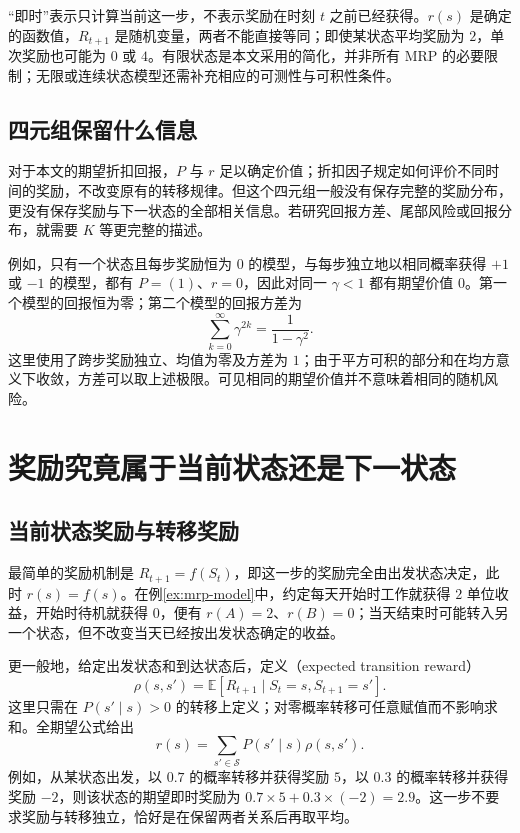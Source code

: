 \documentclass[UTF8]{ctexart}
\begin{document}
“即时”表示只计算当前这一步，不表示奖励在时刻 $t$ 之前已经获得。$r(s)$ 是确定的函数值，$R_{t+1}$ 是随机变量，两者不能直接等同；即使某状态平均奖励为 $2$，单次奖励也可能为 $0$ 或 $4$。有限状态是本文采用的简化，并非所有 MRP 的必要限制；无限或连续状态模型还需补充相应的可测性与可积性条件。

\subsection{四元组保留什么信息}

对于本文的期望折扣回报，$P$ 与 $r$ 足以确定价值；折扣因子规定如何评价不同时间的奖励，不改变原有的转移规律。但这个四元组一般没有保存完整的奖励分布，更没有保存奖励与下一状态的全部相关信息。若研究回报方差、尾部风险或回报分布，就需要 $K$ 等更完整的描述。

例如，只有一个状态且每步奖励恒为 $0$ 的模型，与每步独立地以相同概率获得 $+1$ 或 $-1$ 的模型，都有 $P=(1)$、$r=0$，因此对同一 $\gamma<1$ 都有期望价值 $0$。第一个模型的回报恒为零；第二个模型的回报方差为
\[
  \sum_{k=0}^{\infty}\gamma^{2k}=\frac{1}{1-\gamma^2}.
\]
这里使用了跨步奖励独立、均值为零及方差为 $1$；由于平方可积的部分和在均方意义下收敛，方差可以取上述极限。可见相同的期望价值并不意味着相同的随机风险。

\section{奖励究竟属于当前状态还是下一状态}
\label{sec:mrp-reward-timing}

\subsection{当前状态奖励与转移奖励}

最简单的奖励机制是 $R_{t+1}=f(S_t)$，即这一步的奖励完全由出发状态决定，此时 $r(s)=f(s)$。在例\ref{ex:mrp-model}中，约定每天开始时工作就获得 $2$ 单位收益，开始时待机就获得 $0$，便有 $r(A)=2$、$r(B)=0$；当天结束时可能转入另一个状态，但不改变当天已经按出发状态确定的收益。

更一般地，给定出发状态和到达状态后，定义（expected transition reward）
\begin{equation}
  \rho(s,s')=\mathbb E[R_{t+1}\mid S_t=s,S_{t+1}=s'].
  \label{eq:mrp-transition-reward}
\end{equation}
这里只需在 $P(s'\mid s)>0$ 的转移上定义；对零概率转移可任意赋值而不影响求和。全期望公式给出
\begin{equation}
  r(s)=\sum_{s'\in\mathcal S}P(s'\mid s)\rho(s,s').
  \label{eq:mrp-reward-average}
\end{equation}
例如，从某状态出发，以 $0.7$ 的概率转移并获得奖励 $5$，以 $0.3$ 的概率转移并获得奖励 $-2$，则该状态的期望即时奖励为 $0.7\times5+0.3\times(-2)=2.9$。这一步不要求奖励与转移独立，恰好是在保留两者关系后再取平均。
\end{document}

